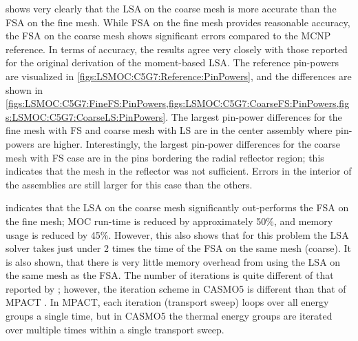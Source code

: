 {{{       shows very clearly that the \ac{LSA} on the coarse mesh is more accurate than the \ac{FSA} on the fine mesh.
      While \ac{FSA} on the fine mesh provides reasonable accuracy, the \ac{FSA} on the coarse mesh shows significant errors compared to the MCNP reference.
      In terms of accuracy, the results agree very closely with those reported for the original derivation of the moment-based \ac{LSA}.
      The reference pin-powers are visualized in \cref{figs:LSMOC:C5G7:Reference:PinPowers}, and the differences are shown in \cref{figs:LSMOC:C5G7:FineFS:PinPowers,figs:LSMOC:C5G7:CoarseFS:PinPowers,figs:LSMOC:C5G7:CoarseLS:PinPowers}.
      The largest pin-power differences for the fine mesh with \ac{FS} and coarse mesh with \ac{LS} are in the center assembly where pin-powers are higher.
      Interestingly, the largest pin-power differences for the coarse mesh with \ac{FS} case are in the pins bordering the radial reflector region;
        this indicates that the mesh in the reflector was not sufficient.
      Errors in the interior of the assemblies are still larger for this case than the others.

       indicates that the \ac{LSA} on the coarse mesh significantly out-performs the \ac{FSA} on the fine mesh;
      \ac{MOC} run-time is reduced by approximately 50\%, and memory usage is reduced by 45\%.
      However, this also shows that for this problem the \ac{LSA} solver takes just under 2 times the time of the \ac{FSA} on the same mesh (coarse).
      It is also shown, that there is very little memory overhead from using the \ac{LSA} on the same mesh as the \ac{FSA}.
      The number of iterations is quite different of that reported by \citet{Ferrer2016}; however, the iteration scheme in CASMO5 is different than that of MPACT \cite{FerrerPersoanlCommunications2018}.
      In MPACT, each iteration (transport sweep) loops over all energy groups a single time, but in CASMO5 the thermal energy groups are iterated over multiple times within a single transport sweep.

}}}
